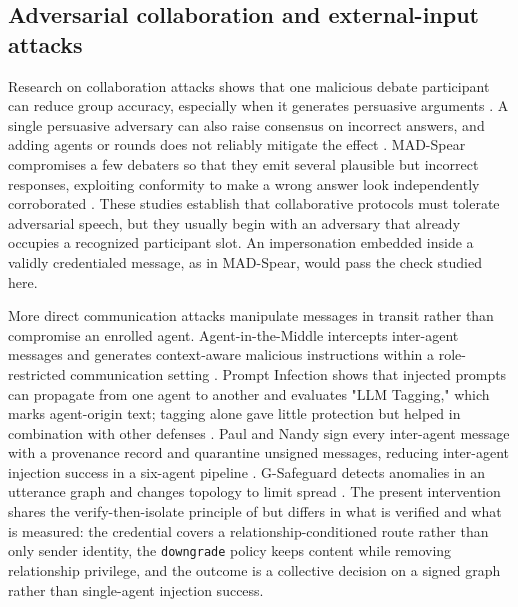 \documentclass[11pt]{article}
\begin{document}
\subsection{Adversarial collaboration and external-input attacks}

Research on collaboration attacks shows that one malicious debate participant can reduce group accuracy, especially when it generates persuasive arguments \cite{amayuelas2024attack}. A single persuasive adversary can also raise consensus on incorrect answers, and adding agents or rounds does not reliably mitigate the effect \cite{kraidia2026persuasion}. MAD-Spear compromises a few debaters so that they emit several plausible but incorrect responses, exploiting conformity to make a wrong answer look independently corroborated \cite{cui2025madspear}. These studies establish that collaborative protocols must tolerate adversarial speech, but they usually begin with an adversary that already occupies a recognized participant slot. An impersonation embedded inside a validly credentialed message, as in MAD-Spear, would pass the check studied here.

More direct communication attacks manipulate messages in transit rather than compromise an enrolled agent. Agent-in-the-Middle intercepts inter-agent messages and generates context-aware malicious instructions within a role-restricted communication setting \cite{he2025redteaming}. Prompt Infection shows that injected prompts can propagate from one agent to another and evaluates "LLM Tagging," which marks agent-origin text; tagging alone gave little protection but helped in combination with other defenses \cite{lee2024promptinfection}. Paul and Nandy sign every inter-agent message with a provenance record and quarantine unsigned messages, reducing inter-agent injection success in a six-agent pipeline \cite{paul2026beyond}. G-Safeguard detects anomalies in an utterance graph and changes topology to limit spread \cite{wang2025gsafeguard}. The present intervention shares the verify-then-isolate principle of \cite{paul2026beyond} but differs in what is verified and what is measured: the credential covers a relationship-conditioned route rather than only sender identity, the \texttt{downgrade} policy keeps content while removing relationship privilege, and the outcome is a collective decision on a signed graph rather than single-agent injection success.
\end{document}
